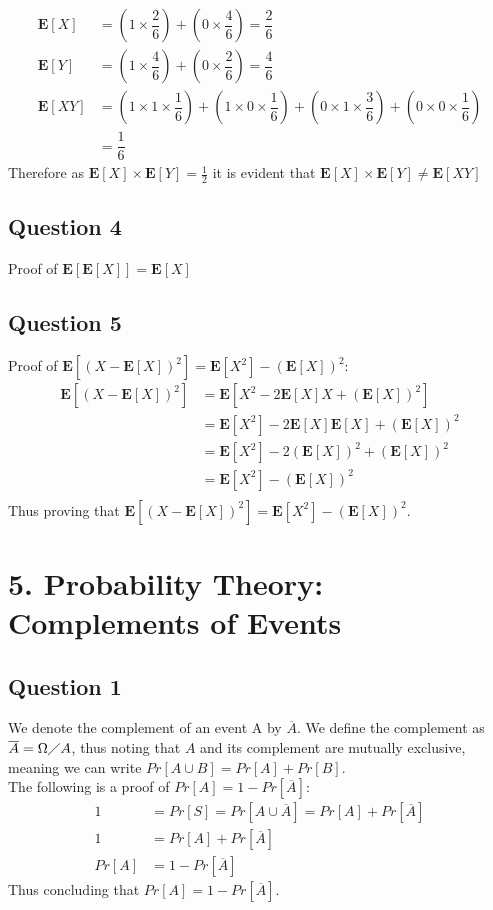 \documentclass{article}
\begin{document}
\begin{align*}
\mathbf{E}[X] &= \left(1 \times \dfrac{2}{6} \right) + \left(0 \times \dfrac{4}{6}\right) = \dfrac{2}{6} \\
\mathbf{E}[Y] &= \left(1 \times \dfrac{4}{6}\right) + \left(0 \times \dfrac{2}{6}\right) = \dfrac{4}{6} \\
\mathbf{E}[XY] &= \left(1 \times 1 \times \dfrac{1}{6}\right) + \left(1 \times 0 \times \dfrac{1}{6}\right) + \left(0 \times 1  \times \dfrac{3}{6}\right) + \left(0 \times 0 \times \dfrac{1}{6}\right) \\
&= \dfrac{1}{6}
\end{align*}
Therefore as $\mathbf{E}[X] \times \mathbf{E}[Y] = \frac{1}{2} $ it is evident that $\mathbf{E}[X] \times \mathbf{E}[Y] \neq \mathbf{E}[XY]$




\subsection{Question 4}
Proof of $ \mathbf{E}[\mathbf{E}[X]] = \mathbf{E}[X] $
\subsection{Question 5}
Proof of $\mathbf{E}\left[(X-\mathbf{E}[X])^2 \right] = 
\mathbf{E}[X^2]-\left( \mathbf{E}[X] \right) ^2:
$
\begin{align*}
\mathbf{E}\left[(X-\mathbf{E}[X])^2 \right] &=
\mathbf{E}\left[X^2-2\mathbf{E}[X]X+  \left(\mathbf{E}[X]\right)^2 \right]\\
&=
\mathbf{E}[X^2]-2\mathbf{E}[X]\mathbf{E}[X]+\left(\mathbf{E}[X]\right)^2 \\
&=
\mathbf{E}[X^2]-2 \left(\mathbf{E}[X]\right)^2 +\left(\mathbf{E}[X]\right)^2 \\
&=
\mathbf{E}[X^2]-\left(\mathbf{E}[X]\right)^2\\
\end{align*}
Thus proving that $\mathbf{E}\left[(X-\mathbf{E}[X])^2 \right] = 
\mathbf{E}[X^2]-\left( \mathbf{E}[X] \right) ^2$.


\section{5. Probability Theory: Complements of Events}
\subsection{Question 1}
We denote the complement of an event A by $\overline{A}$. We define the complement as $\overline{A} = \Omega \diagup A$, thus noting that $A$ and its complement are mutually exclusive, meaning we can write $Pr[A\cup B] = Pr[A] + Pr[B]$. \\
The following is a proof of $Pr[A] = 1 - Pr[\overline{A}]$:
\begin{align*}
1 &= Pr[S] = Pr[A \cup \overline{A}] = Pr[A]+ Pr[\overline{A}] \\
1 &= Pr[A]+ Pr[\overline{A}] \\
Pr[A] &= 1 - Pr[\overline{A}]
\end{align*}
Thus concluding that $Pr[A] = 1 - Pr[\overline{A}]$.
\end{document}
